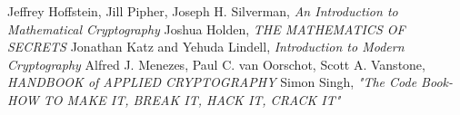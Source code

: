 \documentclass[11pt]{article} %
\begin{document}
\begin{thebibliography}{20} 
  Jeffrey Hoffstein, Jill Pipher, Joseph H. Silverman, \emph{An Introduction to Mathematical Cryptography}
  Joshua Holden, \emph{THE MATHEMATICS OF SECRETS}
  Jonathan Katz and Yehuda Lindell, \emph{Introduction to Modern Cryptography}
  Alfred J. Menezes, Paul C. van Oorschot, Scott A. Vanstone, \emph{HANDBOOK of APPLIED CRYPTOGRAPHY}
  Simon Singh,\emph{ "The Code Book- HOW TO MAKE IT, BREAK IT, HACK IT, CRACK IT"}
\end{thebibliography}

\end{document}
